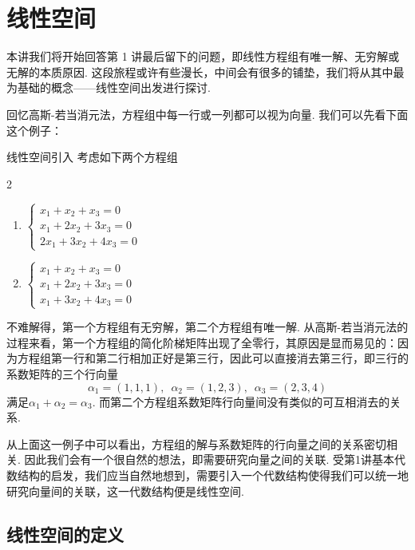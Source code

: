 \chapter{线性空间}

本讲我们将开始回答第 1 讲最后留下的问题，即线性方程组有唯一解、无穷解或无解的本质原因. 这段旅程或许有些漫长，中间会有很多的铺垫，我们将从其中最为基础的概念——线性空间出发进行探讨.

回忆高斯-若当消元法，方程组中每一行或一列都可以视为向量. 我们可以先看下面这个例子：
\begin{example}{}{线性空间引入}
    考虑如下两个方程组
    \begin{multicols}{2}
        \begin{enumerate}
            \item $\begin{cases}
                          x_1+x_2+x_3=0   \\
                          x_1+2x_2+3x_3=0 \\
                          2x_1+3x_2+4x_3=0
                      \end{cases}$

            \item $\begin{cases}
                          x_1+x_2+x_3=0   \\
                          x_1+2x_2+3x_3=0 \\
                          x_1+3x_2+4x_3=0
                      \end{cases}$
        \end{enumerate}
    \end{multicols}
    不难解得，第一个方程组有无穷解，第二个方程组有唯一解. 从高斯-若当消元法的过程来看，第一个方程组的简化阶梯矩阵出现了全零行，其原因是显而易见的：因为方程组第一行和第二行相加正好是第三行，因此可以直接消去第三行，即三行的系数矩阵的三个行向量
    \[\alpha_1=(1,1,1),\enspace\alpha_2=(1,2,3),\enspace\alpha_3=(2,3,4)\]
    满足$\alpha_1+\alpha_2=\alpha_3$. 而第二个方程组系数矩阵行向量间没有类似的可互相消去的关系.
\end{example}

从上面这一例子中可以看出，方程组的解与系数矩阵的行向量之间的关系密切相关. 因此我们会有一个很自然的想法，即需要研究向量之间的关联. 受第1讲基本代数结构的启发，我们应当自然地想到，需要引入一个代数结构使得我们可以统一地研究向量间的关联，这一代数结构便是线性空间.

\section{线性空间的定义}

